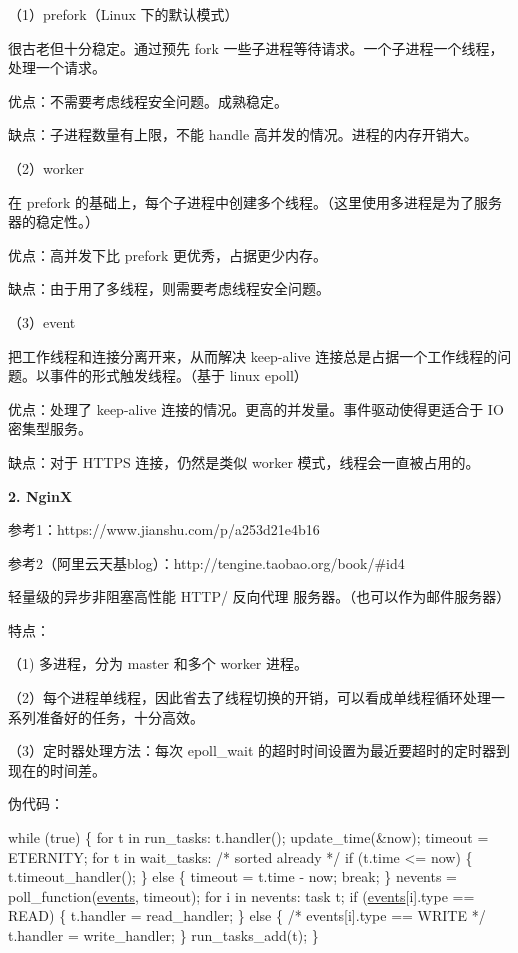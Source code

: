 （1）prefork（\+Linux 下的默认模式）

很古老但十分稳定。通过预先 fork 一些子进程等待请求。一个子进程一个线程，处理一个请求。

优点：不需要考虑线程安全问题。成熟稳定。

缺点：子进程数量有上限，不能 handle 高并发的情况。进程的内存开销大。

（2）worker

在 prefork 的基础上，每个子进程中创建多个线程。（这里使用多进程是为了服务器的稳定性。）

优点：高并发下比 prefork 更优秀，占据更少内存。

缺点：由于用了多线程，则需要考虑线程安全问题。

（3）event

把工作线程和连接分离开来，从而解决 keep-\/alive 连接总是占据一个工作线程的问题。以事件的形式触发线程。（基于 linux epoll）

优点：处理了 keep-\/alive 连接的情况。更高的并发量。事件驱动使得更适合于 IO 密集型服务。

缺点：对于 H\+T\+T\+PS 连接，仍然是类似 worker 模式，线程会一直被占用的。

{\bfseries 2. NginX}

参考1：https\+://www.jianshu.\+com/p/a253d21e4b16

参考2（阿里云天基blog）：http\+://tengine.taobao.\+org/book/\#id4

轻量级的异步非阻塞高性能 H\+T\+T\+P/ 反向代理 服务器。（也可以作为邮件服务器）

特点：

（1) 多进程，分为 master 和多个 worker 进程。

（2）每个进程单线程，因此省去了线程切换的开销，可以看成单线程循环处理一系列准备好的任务，十分高效。

（3）定时器处理方法：每次 epoll\+\_\+wait 的超时时间设置为最近要超时的定时器到现在的时间差。

伪代码： 
\begin{DoxyCode}
\textcolor{keywordflow}{while} (\textcolor{keyword}{true}) \{
    \textcolor{keywordflow}{for} t in run\_tasks:
        t.handler();
    update\_time(&now);
    timeout = ETERNITY;
    \textcolor{keywordflow}{for} t in wait\_tasks: \textcolor{comment}{/* sorted already */}
        \textcolor{keywordflow}{if} (t.time <= now) \{
            t.timeout\_handler();
        \} \textcolor{keywordflow}{else} \{
            timeout = t.time - now;
            \textcolor{keywordflow}{break};
        \}
    nevents = poll\_function(\hyperlink{pink__epoll_8cpp_a18bcd14e4d4cab5184d3b046754cd248}{events}, timeout);
    \textcolor{keywordflow}{for} i in nevents:
        task t;
        \textcolor{keywordflow}{if} (\hyperlink{pink__epoll_8cpp_a18bcd14e4d4cab5184d3b046754cd248}{events}[i].type == READ) \{
            t.handler = read\_handler;
        \} \textcolor{keywordflow}{else} \{ \textcolor{comment}{/* events[i].type == WRITE */}
            t.handler = write\_handler;
        \}
        run\_tasks\_add(t);
\}
\end{DoxyCode}


